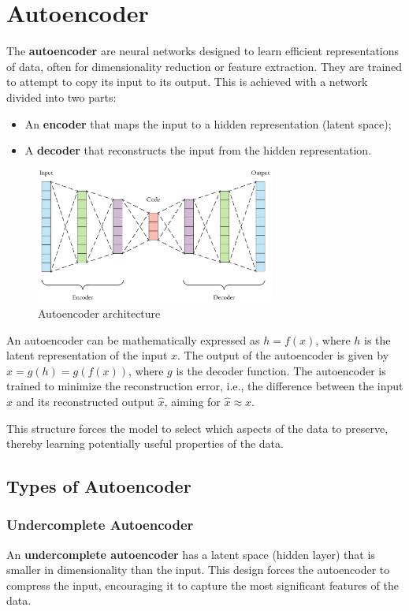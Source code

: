 \chapter{Autoencoder}
The \textbf{autoencoder} are neural networks designed to learn efficient
representations of data, often for dimensionality reduction or feature extraction.
They are trained to attempt to copy its input to its output. This is achieved
with a network divided into two parts:
\begin{itemize}
    \item An \textbf{encoder} that maps the input to a hidden representation (latent space);
    \item A \textbf{decoder} that reconstructs the input from the hidden representation.
\end{itemize}

\begin{figure}[!ht]
    \centering
    \includegraphics[width=0.7\textwidth]{img/Autoencoder/autoencoder.png}
    \caption{Autoencoder architecture}
    \label{fig:autoencoder}
\end{figure}

An autoencoder can be mathematically expressed as $h = f(x)$, where $h$ is the
latent representation of the input $x$. The output of the autoencoder is given by
$\hat{x} = g(h) = g(f(x))$, where $g$ is the decoder function. The autoencoder is
trained to minimize the reconstruction error, i.e., the difference between the
input $x$ and its reconstructed output $\hat{x}$, aiming for $\hat{x} \approx x$.

This structure forces the model to select which aspects of the data to preserve,
thereby learning potentially useful properties of the data.
\section{Types of Autoencoder}
\subsection{Undercomplete Autoencoder}
An \textbf{undercomplete autoencoder} has a latent space (hidden layer) that is
smaller in dimensionality than the input. This design forces the autoencoder to
compress the input, encouraging it to capture the most significant features of
the data.

